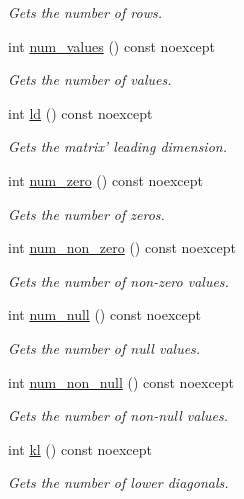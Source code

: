 \begin{DoxyCompactItemize}
\begin{DoxyCompactList}\small\item\em Gets the number of rows. \end{DoxyCompactList}\item 
int \hyperlink{classmtk_1_1Matrix_a3de8111d1bc19696652c4fe6219e1abe}{num\+\_\+values} () const noexcept
\begin{DoxyCompactList}\small\item\em Gets the number of values. \end{DoxyCompactList}\item 
int \hyperlink{classmtk_1_1Matrix_ad69f7dae5950c1a3ea5c4d8072229fe2}{ld} () const noexcept
\begin{DoxyCompactList}\small\item\em Gets the matrix' leading dimension. \end{DoxyCompactList}\item 
int \hyperlink{classmtk_1_1Matrix_a17f99bfdf7b8071962c37550028c22b5}{num\+\_\+zero} () const noexcept
\begin{DoxyCompactList}\small\item\em Gets the number of zeros. \end{DoxyCompactList}\item 
int \hyperlink{classmtk_1_1Matrix_a40b4dc068683b2a5024692d9cc62f221}{num\+\_\+non\+\_\+zero} () const noexcept
\begin{DoxyCompactList}\small\item\em Gets the number of non-\/zero values. \end{DoxyCompactList}\item 
int \hyperlink{classmtk_1_1Matrix_a79ac4c1b31cef05b41a123917b0ad32f}{num\+\_\+null} () const noexcept
\begin{DoxyCompactList}\small\item\em Gets the number of null values. \end{DoxyCompactList}\item 
int \hyperlink{classmtk_1_1Matrix_ac3223d10accd4948807f58fc924f043f}{num\+\_\+non\+\_\+null} () const noexcept
\begin{DoxyCompactList}\small\item\em Gets the number of non-\/null values. \end{DoxyCompactList}\item 
int \hyperlink{classmtk_1_1Matrix_ae6400690d7e9fe2fd00cb678a4033f3c}{kl} () const noexcept
\begin{DoxyCompactList}\small\item\em Gets the number of lower diagonals. \end{DoxyCompactList}\item 

\end{DoxyCompactItemize}
